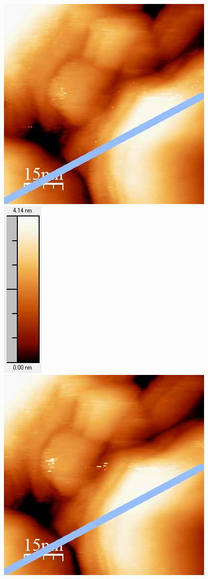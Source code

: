 \documentclass[12pt,a4paper]{article}
\begin{document}
\begin{figure}[H]
\centering
\includegraphics[scale=0.6]{Bilder/Anhang/Zeit/0_6_Zeit_vor.jpg}
\includegraphics[scale=0.6]{Bilder/Anhang/Zeit/0_6_Zeit_vor_Skala.jpg}
\includegraphics[scale=0.6]{Bilder/Anhang/Zeit/0_6_Zeit_nach.jpg}

\end{figure}
\end{document}
